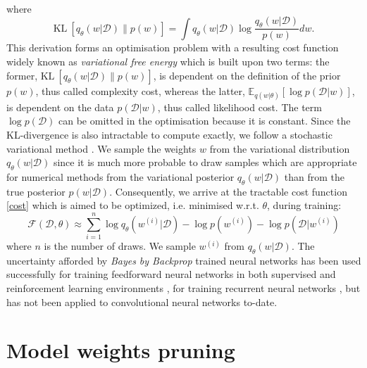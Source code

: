 where
\begin{equation}
    \text{KL} \ [q_{\theta}(w|\mathcal{D})\|p(w)]= \int q_{\theta}(w|\mathcal{D})\log\frac{q_{\theta}(w|\mathcal{D})}{p(w)}dw .
\end{equation}
This derivation forms an optimisation problem with a resulting cost function widely known as \textit{variational free energy} \cite{neal1998view,yedidia2005constructing,friston2007variational} which is built upon two terms: the former, $\text{KL} \ [q_{\theta}(w|\mathcal{D})\|p(w)]$, is dependent on the definition of the prior $p(w)$, thus called complexity cost, whereas the latter, $\mathbb{E}_{q(w|\theta)}[\log p(\mathcal{D}|w)]$, is dependent on the data $p(\mathcal{D}|w)$, thus called likelihood cost. 
The term $\log p(\mathcal{D})$ can be omitted in the optimisation because it is constant.
\newline Since the KL-divergence is also intractable to compute exactly, we follow a stochastic variational method \cite{graves2011practical,blundell2015weight}.
We sample the weights $w$ from the variational distribution $q_{\theta}(w|\mathcal{D})$ since it is much more probable to draw samples which are appropriate for numerical methods from the variational posterior $q_{\theta}(w|\mathcal{D})$ than from the true posterior $p(w|\mathcal{D})$. Consequently, we arrive at the tractable cost function \eqref{cost} which is aimed to be optimized, i.e. minimised w.r.t. $\theta$, during training:
\begin{equation} \label{cost}
    \mathcal{F}(\mathcal{D}, \theta)\approx \sum_{i=1}^n \log q_{\theta}(w^{(i)}|\mathcal{D})-\log p(w^{(i)})-\log p(\mathcal{D}|w^{(i)})
\end{equation}
%
where $n$ is the number of draws.
\newline We sample $w^{(i)}$ from $q_{\theta}(w|\mathcal{D})$. The uncertainty afforded by \textit{Bayes by Backprop} trained neural networks has been used successfully for training feedforward neural networks in both supervised and reinforcement learning environments \cite{blundell2015weight,lipton2016efficient,houthooft2016curiosity}, for training recurrent neural networks \cite{fortunato2017bayesian}, but has not been applied to convolutional neural networks to-date.

\section{Model weights pruning}

